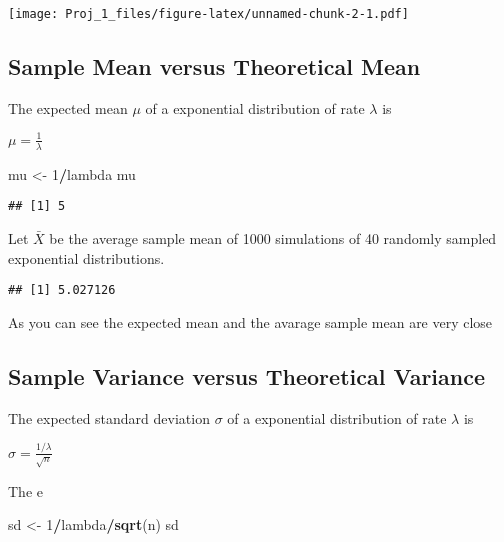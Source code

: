 \documentclass[]{article}
\newenvironment{Shaded}{\begin{snugshade}}{\end{snugshade}}
\newcommand{\KeywordTok}[1]{\textcolor[rgb]{0.13,0.29,0.53}{\textbf{#1}}}
\newcommand{\DecValTok}[1]{\textcolor[rgb]{0.00,0.00,0.81}{#1}}
\newcommand{\StringTok}[1]{\textcolor[rgb]{0.31,0.60,0.02}{#1}}
\newcommand{\OperatorTok}[1]{\textcolor[rgb]{0.81,0.36,0.00}{\textbf{#1}}}
\newcommand{\NormalTok}[1]{#1}
\begin{document}
\texttt{[image: Proj\_1\_files/figure-latex/unnamed-chunk-2-1.pdf]}

\subsection{Sample Mean versus Theoretical
Mean}\label{sample-mean-versus-theoretical-mean}

The expected mean \(\mu\) of a exponential distribution of rate
\(\lambda\) is

\(\mu= \frac{1}{\lambda}\)

\begin{Shaded}
\begin{Highlighting}[]
\NormalTok{mu <-}\StringTok{ }\DecValTok{1}\OperatorTok{/}\NormalTok{lambda}
\NormalTok{mu}
\end{Highlighting}
\end{Shaded}

\begin{verbatim}
## [1] 5
\end{verbatim}

Let \(\bar X\) be the average sample mean of 1000 simulations of 40
randomly sampled exponential distributions.

\begin{Shaded}
\end{Shaded}

\begin{verbatim}
## [1] 5.027126
\end{verbatim}

As you can see the expected mean and the avarage sample mean are very
close

\subsection{Sample Variance versus Theoretical
Variance}\label{sample-variance-versus-theoretical-variance}

The expected standard deviation \(\sigma\) of a exponential distribution
of rate \(\lambda\) is

\(\sigma = \frac{1/\lambda}{\sqrt{n}}\)

The e

\begin{Shaded}
\begin{Highlighting}[]
\NormalTok{sd <-}\StringTok{ }\DecValTok{1}\OperatorTok{/}\NormalTok{lambda}\OperatorTok{/}\KeywordTok{sqrt}\NormalTok{(n)}
\NormalTok{sd}
\end{Highlighting}
\end{Shaded}
\end{document}
